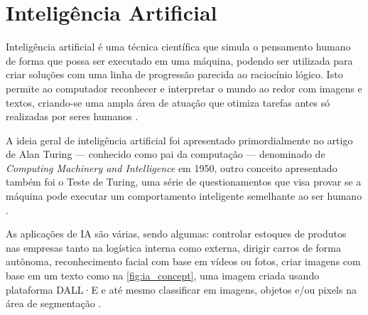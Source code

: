 \section{Inteligência Artificial}

Inteligência artificial é uma técnica científica que simula o pensamento humano de forma que possa ser executado em uma máquina, podendo ser utilizada para criar soluções com uma linha de progressão parecida ao raciocínio lógico. Isto permite ao computador reconhecer e interpretar o mundo ao redor com imagens e textos, criando-se uma ampla área de atuação que otimiza tarefas antes só realizadas por seres humanos \space\cite{ia_aliada_ou_inimiga}.



A ideia geral de inteligência artificial foi apresentado primordialmente no artigo de Alan Turing — conhecido como pai da computação — denominado de \textit{Computing Machinery and Intelligence} em 1950, outro conceito apresentado também foi o Teste de Turing, uma série de questionamentos que visa provar se a máquina pode executar um comportamento inteligente semelhante ao ser humano \cite{NationalGeographic2023}.

As aplicações de IA são várias, sendo algumas: controlar estoques de produtos nas empresas tanto na logística interna como externa, dirigir carros de forma autônoma, reconhecimento facial com base em vídeos ou fotos, criar imagens com base em um texto como na \cref{fig:ia_concept}, uma imagem criada usando plataforma DALL·E e até mesmo classificar em imagens, objetos e/ou pixels na área de segmentação \cite{Stefanini, OpenAI2021}.

